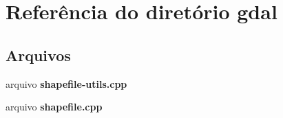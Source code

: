 \section{Referência do diretório gdal}
\label{dir_49527639ff4929aac25ded0c95ce6492}
\subsection*{Arquivos}
\begin{DoxyCompactItemize}
\item 
arquivo {\bf shapefile-\/utils.\+cpp}
\item 
arquivo {\bf shapefile.\+cpp}
\end{DoxyCompactItemize}
